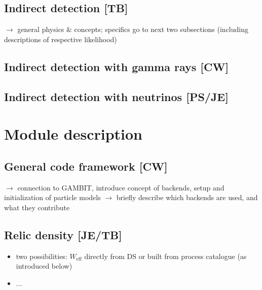 \subsection{Indirect detection {\bf [TB]}}
\label{phys_id}

$\to$ general physics \& concepts; specifics go to next two subsections 
(including descriptions of respective likelihood)

\subsection{Indirect detection with gamma rays {\bf [CW]}}
\label{phys_ga}

\subsection{Indirect detection with neutrinos {\bf [PS/JE]}}
\label{phys_nu}




\section{Module description}
\label{code}


\subsection{General code framework {\bf [CW]}}
\label{code_gen}

$\to$ connection to GAMBIT, introduce concept of backends, setup and initialization of particle models
\noindent
$\to$ briefly describe which backends are used, and what they contribute 


\subsection{Relic density {\bf [JE/TB]}}
\label{code_rd}
\begin{itemize}
\item two possibilities: $W_\mathrm{eff}$ directly from DS or built from process catalogue (as introduced below)
\item...
\end{itemize}

